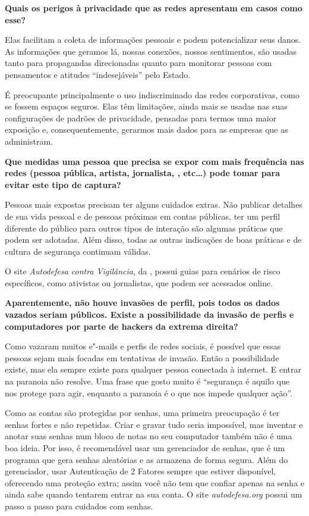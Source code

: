 \bigskip

\noindent{}\textbf{Quais os perigos à privacidade que as redes apresentam em casos
como esse?}

Elas facilitam a coleta de informações pessoais e
podem potencializar seus danos. As informações que geramos lá, nossas
conexões, nossos sentimentos, são usadas tanto para propagandas
direcionadas quanto para monitorar pessoas com pensamentos e atitudes
``indesejáveis'' pelo Estado.

É preocupante principalmente o uso indiscriminado das redes
corporativas, como se fossem espaços seguros. Elas têm limitações, ainda
mais se usadas nas suas configurações de padrões de privacidade,
pensadas para termos uma maior exposição e, consequentemente, gerarmos
mais dados para as empresas que as administram.

\bigskip

\noindent{}\textbf{Que medidas uma pessoa que precisa se expor com mais frequência
nas redes (pessoa pública, artista, jornalista, , etc\ldots{}) pode tomar
para evitar este tipo de captura?}

Pessoas mais expostas precisam ter alguns cuidados
extras. Não publicar detalhes de sua vida pessoal e de pessoas próximas
em contas públicas, ter um perfil diferente do público para outros tipos
de interação são algumas práticas que podem ser adotadas. Além disso,
todas as outras indicações de boas práticas e de cultura de segurança
continuam válidas.

O site \emph{Autodefesa contra
Vigilância}, da , possui guias para cenários de risco
específicos, como ativistas ou jornalistas, que podem ser acessados
online.

\bigskip

\noindent{}\textbf{Aparentemente, não houve invasões de perfil, pois todos os dados
vazados seriam públicos. Existe a possibilidade da invasão de perfis e
computadores por parte de hackers da extrema direita?}

Como vazaram muitos e"-mails e perfis de redes
sociais, é possível que essas pessoas sejam mais focadas em tentativas de
invasão. Então a possibilidade existe, mas ela sempre existe para
qualquer pessoa conectada à internet. E entrar na paranoia não resolve.
Uma frase que gosto muito é ``segurança é aquilo que nos protege para
agir, enquanto a paranoia é o que nos impede qualquer ação''.

Como as contas são protegidas por senhas, uma primeira preocupação é ter
senhas fortes e não repetidas. Criar e gravar tudo seria impossível, mas
inventar e anotar suas senhas num bloco de notas no seu computador
também não é uma boa ideia. Por isso, é recomendável usar um gerenciador
de senhas, que é um programa que gera senhas aleatórias e as armazena de
forma segura. Além do gerenciador, usar Autenticação de 2 Fatores sempre
que estiver disponível, oferecendo uma proteção extra; assim você não
tem que confiar apenas na senha e ainda sabe quando tentarem entrar na
sua conta. O site \emph{autodefesa.org} possui
um passo a passo
para cuidados com senhas.

